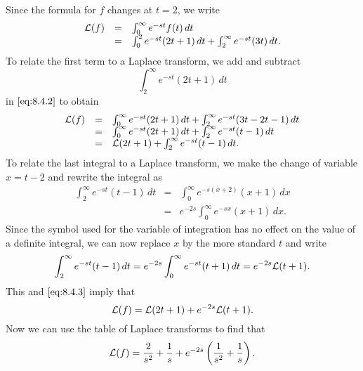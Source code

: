 \documentclass{ximera}
\begin{document}
\begin{example}
\begin{explanation}
Since the formula for $f$ changes at $t=2$, we write
\begin{equation}\label{eq:8.4.2}
\begin{array}{ccl}
{\cal L}(f)&=&\int_0^\infty e^{-st}f(t)\,dt\\
&=&\int_0^2 e^{-st}(2t+1)\,dt+\int_2^\infty e^{-st}(3t)\,dt.
\end{array}
\end{equation}
To relate the first term to a Laplace transform,  we add and subtract
$$
\int_2^\infty e^{-st}(2t+1)\,dt
$$
in $\eqref{eq:8.4.2}$ to obtain
\begin{equation}\label{eq:8.4.3}
\begin{array}{ccl}
{\cal L}(f)&=&\int_0^\infty e^{-st}(2t+1)\,dt+
\int_2^\infty e^{-st}(3t-2t-1)\,dt\\
&=&\int_0^\infty e^{-st}(2t+1)\,dt+
\int_2^\infty e^{-st}(t-1)\,dt\\
&=&{\cal L}(2t+1)+\int_2^\infty e^{-st}(t-1)\,dt.
\end{array}
\end{equation}
To relate the last integral to a Laplace transform,
  we make the change of variable
 $x=t-2$ and rewrite the integral as
\begin{eqnarray*}
\int_2^\infty e^{-st}(t-1)\,dt&=&\int_0^\infty e^{-s(x+2)}(x+1)\,dx
\\
&=&e^{-2s}\int_0^\infty e^{-sx}(x+1)\,dx.
\end{eqnarray*}
Since the symbol used for the variable of integration has no effect on the
value of a definite integral, we can now replace $x$ by the more standard
$t$ and write
$$
\int_2^\infty e^{-st}(t-1)\,dt
=e^{-2s}\int_0^\infty e^{-st}(t+1)\,dt=e^{-2s}{\cal L}(t+1).
$$
This and $\eqref{eq:8.4.3}$ imply that
$$
{\cal L}(f)={\cal L}(2t+1)+e^{-2s}{\cal L} (t+1).
$$
Now we can use the table of Laplace transforms to find that
$$
{\cal L}(f)=\frac{2}{s^2}+\frac{1}{s} +e^{-2s}\left(\frac{1}{s^2}+\frac{1}{s}\right).
$$
\end{explanation}
\end{example}

\end{document}

